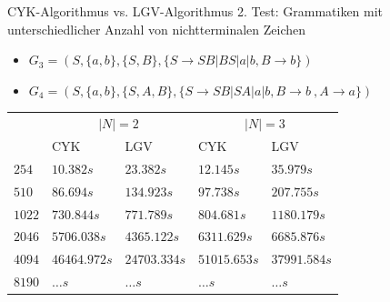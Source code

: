 \documentclass{beamer}
\begin{document}
	\begin{frame}{CYK-Algorithmus vs. LGV-Algorithmus}
		2. Test: Grammatiken mit unterschiedlicher Anzahl von nichtterminalen Zeichen
		\pause
		\begin{itemize}
			\item $G_3 = (S, \{a,b\}, \{S,B\}, \{S\to SB | BS | a | b ,B\to b\})$
			\item $G_4 = (S, \{a,b\}, \{S,A,B\}, \{S\to SB | SA | a | b ,B\to b\ ,A\to a\})$
		\end{itemize}
		\pause
		\begin{table}[H]
			\centering
			\begin{tabular}{|m{2cm}||m{1.7cm}|m{1.7cm}||m{1.7cm}|m{1.7cm}|}  
				\hline
				\multirow{2}{*}{\diagbox[width=\dimexpr \textwidth/8+4.5\tabcolsep\relax, height=1cm]{$|w|$}{$Grammatik$}}& \multicolumn{2}{c||}{$|N|=2$}  & \multicolumn{2}{c|}{$|N|=3$}\\ [0.5ex] 
				\cline{2-5}
				& CYK & LGV & CYK & LGV \\
				\hline\hline
				$254$ & $10.382s$& $23.382s$&$12.145s$& $35.979s$\\[1ex]
				\hline
				$510$ & $86.694s$& $134.923s$& $97.738s$& $207.755s$\\[1ex]
				\hline
				$1022$ & $730.844s$& \cellcolor{lightgray}$771.789s$& $804.681s$& $1180.179s$\\[1ex]
				\hline
				$2046$ & $5706.038s$& \cellcolor{green}$4365.122s$&$6311.629s$& \cellcolor{lightgray}$6685.876s$\\[1ex]
				\hline
				$4094$ & $46464.972s$& $24703.334s$& $51015.653s$& \cellcolor{green}$37991.584s$\\[1ex]
				\hline
				$8190$ & $\ldots s$& $\ldots s$& $\ldots s$& $\ldots s$\\[1ex]
				\hline
			\end{tabular}
		\end{table}
	\end{frame}
	
	
\end{document}
